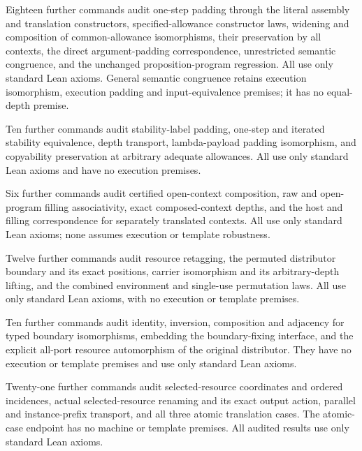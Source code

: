 Eighteen further commands audit one-step padding through the literal assembly
and translation constructors, specified-allowance constructor laws, widening
and composition of common-allowance isomorphisms, their preservation by all
contexts, the direct argument-padding correspondence, unrestricted semantic
congruence, and the unchanged proposition-program regression. All use only
standard Lean axioms. General semantic congruence retains execution isomorphism,
execution padding and input-equivalence premises; it has no equal-depth premise.


Ten further commands audit stability-label padding, one-step and iterated
stability equivalence, depth transport, lambda-payload padding isomorphism,
and copyability preservation at arbitrary adequate allowances. All use only
standard Lean axioms and have no execution premises.


Six further commands audit certified open-context composition, raw and
open-program filling associativity, exact composed-context depths, and the
host and filling correspondence for separately translated contexts. All use
only standard Lean axioms; none assumes execution or template robustness.


Twelve further commands audit resource retagging, the permuted distributor
boundary and its exact positions, carrier isomorphism and its arbitrary-depth
lifting, and the combined environment and single-use permutation laws.
All use only standard Lean axioms, with no execution or template premises.


Ten further commands audit identity, inversion, composition and adjacency
for typed boundary isomorphisms, embedding the boundary-fixing interface,
and the explicit all-port resource automorphism of the original distributor.
They have no execution or template premises and use only standard Lean axioms.


Twenty-one further commands audit selected-resource coordinates and ordered
incidences, actual selected-resource renaming and its exact output action,
parallel and instance-prefix transport, and all three atomic translation cases.
The atomic-case endpoint has no machine or template premises. All audited
results use only standard Lean axioms.

